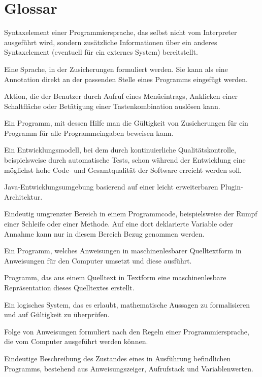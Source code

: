 \section{Glossar}
\newcommand{\glossaritem}[1]{\item[#1]}


\begin{description}
    \label{Zusicherung}
    \glossaritem{Annotation} Syntaxelement einer Programmiersprache, das selbst nicht vom Interpreter ausgeführt wird, sondern zusätzliche Informationen über ein anderes Syntaxelement (eventuell für ein externes System) bereitstellt.
    \glossaritem{Annotationssprache (Beweiser)} Eine Sprache, in der Zusicherungen formuliert werden. Sie kann als eine Annotation direkt an der passenden Stelle eines Programms eingefügt werden.
    \glossaritem{Befehl~(GUI)} Aktion, die der Benutzer durch Aufruf eines Menüeintrags, Anklicken einer Schaltfläche oder Betätigung einer Tastenkombination auslösen kann.
    \glossaritem{Beweiser} Ein Programm, mit dessen Hilfe man die Gültigkeit von Zusicherungen für ein Programm für alle Programmeingaben beweisen kann.
    \glossaritem{Continous Integration} Ein Entwicklungsmodell, bei dem durch kontinuierliche Qualitätskontrolle, beispielsweise durch automatische Tests, schon während der Entwicklung eine möglichst hohe Code- und Gesamtqualität der Software erreicht werden soll.
    \glossaritem{Eclipse} Java-Entwicklungsumgebung basierend auf einer leicht erweiterbaren Plugin-Architektur.
    \glossaritem{Gültigkeitsbereich} Eindeutig umgrenzter Bereich in einem Programmcode, beispielsweise der Rumpf einer Schleife oder einer Methode. Auf eine dort deklarierte Variable oder Annahme kann nur in diesem Bereich Bezug genommen werden.
    \glossaritem{Interpreter} Ein Programm, welches Anweisungen in maschinenlesbarer Quelltextform in Anweisungen für den Computer umsetzt und diese ausführt.
    \glossaritem{Parser} Programm, das aus einem Quelltext in Textform eine maschinenlesbare Repräsentation dieses Quelltextes erstellt.
    \glossaritem{Prädikatenlogik} Ein logisches System, das es erlaubt, mathematische Aussagen zu formalisieren und auf Gültigkeit zu überprüfen. %
    \glossaritem{Programm} Folge von Anweisungen formuliert nach den Regeln einer Programmiersprache, die vom Computer ausgeführt werden können.
    \glossaritem{Programmzustand} Eindeutige Beschreibung des Zustandes eines in Ausführung befindlichen Programms, bestehend aus Anweisungszeiger, Aufrufstack und Variablenwerten.

\end{description}
